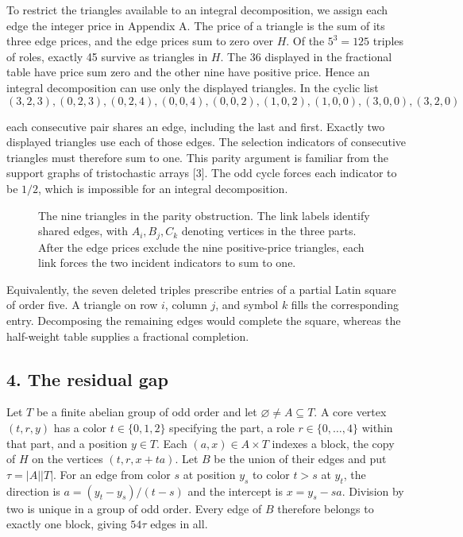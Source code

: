 \documentclass[english,11pt,a4paper]{article}
\begin{document}
To restrict the triangles available to an integral decomposition, we assign each edge the integer price in Appendix A. The price of a triangle is the sum of its three edge prices, and the edge prices sum to zero over \(H\). Of the \(5^3=125\) triples of roles, exactly 45 survive as triangles in \(H\). The 36 displayed in the fractional table have price sum zero and the other nine have positive price. Hence an integral decomposition can use only the displayed triangles. In the cyclic list
\[(3,2,3),(0,2,3),(0,2,4),(0,0,4),(0,0,2),
(1,0,2),(1,0,0),(3,0,0),(3,2,0)\]

each consecutive pair shares an edge, including the last and first. Exactly two displayed triangles use each of those edges. The selection indicators of consecutive triangles must therefore sum to one. This parity argument is familiar from the support graphs of tristochastic arrays {[}3{]}. The odd cycle forces each indicator to be \(1/2\), which is impossible for an integral decomposition.

\begin{figure}[htbp]
\centering
\caption{The nine triangles in the parity obstruction. The link labels identify shared edges, with $A_i,B_j,C_k$ denoting vertices in the three parts. After the edge prices exclude the nine positive-price triangles, each link forces the two incident indicators to sum to one.}\label{fig:odd-cycle}
\end{figure}

Equivalently, the seven deleted triples prescribe entries of a partial Latin square of order five. A triangle on row \(i\), column \(j\), and symbol \(k\) fills the corresponding entry. Decomposing the remaining edges would complete the square, whereas the half-weight table supplies a fractional completion.

\subsection{4. The residual gap}\label{the-residual-gap}

Let \(T\) be a finite abelian group of odd order and let \(\varnothing\ne A\subseteq T\). A core vertex \((t,r,y)\) has a color \(t\in\{0,1,2\}\) specifying the part, a role \(r\in\{0,\ldots,4\}\) within that part, and a position \(y\in T\). Each \((a,x)\in A\times T\) indexes a block, the copy of \(H\) on the vertices \((t,r,x+ta)\). Let \(B\) be the union of their edges and put \(\tau=|A||T|\). For an edge from color \(s\) at position \(y_s\) to color \(t>s\) at \(y_t\), the direction is \(a=(y_t-y_s)/(t-s)\) and the intercept is \(x=y_s-sa\). Division by two is unique in a group of odd order. Every edge of \(B\) therefore belongs to exactly one block, giving \(54\tau\) edges in all.
\end{document}
